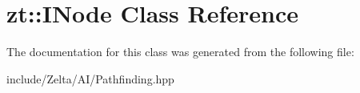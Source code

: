 \hypertarget{classzt_1_1_i_node}{}\section{zt\+:\+:I\+Node Class Reference}
\label{classzt_1_1_i_node}


The documentation for this class was generated from the following file\+:\begin{DoxyCompactItemize}
\item 
include/\+Zelta/\+A\+I/Pathfinding.\+hpp\end{DoxyCompactItemize}
